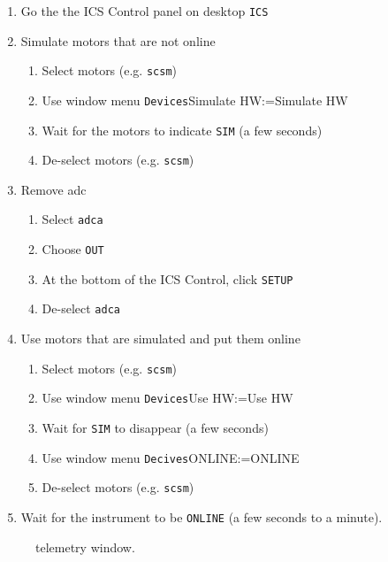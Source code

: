\documentclass[11pt,fleqn,a4paper]{book}
\makeatletter
\def\menu#1#2{\texttt{#1}\ifx{}#2\else\@for\@x:=#2\do{$\rightarrow$\texttt{\@x}}\fi}
\def\wmenu#1#2{window menu \menu{#1}{#2}}
\makeatother
\begin{document}
\label{proc:ferosadcatstartup}
\begin{enumerate}
    \item Go the the \gls{ICS Control} panel on \gls{desktop} \texttt{ICS}
    \item Simulate motors that are not online
    \begin{enumerate}
         \item Select motors (e.g. \texttt{scsm})
         \item Use \wmenu{Devices}{Simulate HW}
         \item Wait for the motors to indicate \texttt{SIM} (a few seconds)
         \item De-select motors (e.g. \texttt{scsm})
    \end{enumerate}
    \item Remove \gls{adc}
    \begin{enumerate}
        \item Select \texttt{adca}
        \item Choose \texttt{OUT}
        \item At the bottom of the ICS Control, click \texttt{SETUP}
        \item De-select \texttt{adca}
    \end{enumerate}
    \item Use motors that are simulated and put them online
    \begin{enumerate}
         \item Select motors (e.g. \texttt{scsm})
         \item Use \wmenu{Devices}{Use HW}
         \item Wait for \texttt{SIM} to disappear (a few seconds)
         \item Use \wmenu{Decives}{ONLINE}
         \item De-select motors (e.g. \texttt{scsm})
    \end{enumerate}
    \item Wait for the instrument to be \texttt{ONLINE} (a few seconds to a minute).
\end{enumerate}

\begin{figure}[t!]
\begin{minipage}{0.48\linewidth}
\end{minipage}
\hspace{0.02\linewidth}
\begin{minipage}{0.48\linewidth}
\end{minipage}
\caption[Telemetry window]{\Gls{telemetry} window.}
\end{figure}
\end{document}
